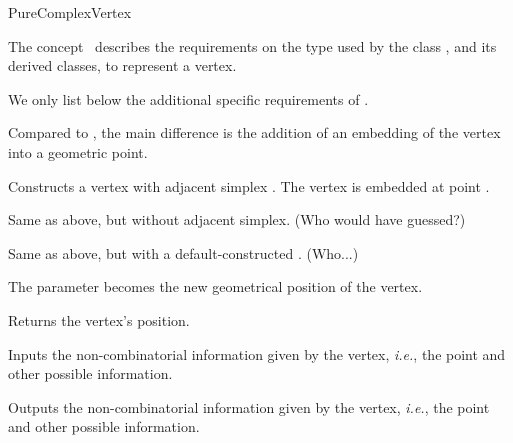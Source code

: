 \begin{ccRefConcept}{PureComplexVertex}

\ccDefinition

The concept \ccRefName\ describes the requirements on the type used by the
class , and its derived classes, to
represent a vertex.

\ccRefines


We only list below the additional specific requirements of \ccRefName.

Compared to , the main difference is the addition of
an embedding of the vertex into a geometric point.

\ccHasModels


\ccTypes


\ccCreation
{}

%
{Constructs a vertex with adjacent simplex . The vertex is embedded at point .}

\ccGlue{}%
{Same as above, but without adjacent simplex. (Who would have guessed?)}

\ccGlue{}%
{Same as above, but with a default-constructed . (Who...)}

\ccOperations

%
{The parameter  becomes the new geometrical position of the vertex.}

%
{Returns the vertex's position.}


%
{Inputs the non-combinatorial information given by the vertex, \emph{i.e.},
the point and other possible information.}

%
{Outputs the non-combinatorial information given by the vertex, \emph{i.e.},
the point and other possible information.}

\ccSeeAlso

\\
\\

\end{ccRefConcept}
